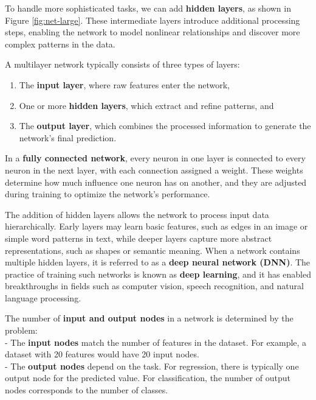 \documentclass[
]{book}
\providecommand{\tightlist}{%
  \setlength{\itemsep}{0pt}\setlength{\parskip}{0pt}}
\theoremstyle{definition}
\theoremstyle{definition}
\theoremstyle{definition}
\theoremstyle{definition}
\theoremstyle{remark}
\begin{document}
To handle more sophisticated tasks, we can add \textbf{hidden layers}, as shown in Figure \ref{fig:net-large}. These intermediate layers introduce additional processing steps, enabling the network to model nonlinear relationships and discover more complex patterns in the data.

A multilayer network typically consists of three types of layers:

\begin{enumerate}
\def\labelenumi{\arabic{enumi}.}
\tightlist
\item
  The \textbf{input layer}, where raw features enter the network,\\
\item
  One or more \textbf{hidden layers}, which extract and refine patterns, and\\
\item
  The \textbf{output layer}, which combines the processed information to generate the network's final prediction.
\end{enumerate}

In a \textbf{fully connected network}, every neuron in one layer is connected to every neuron in the next layer, with each connection assigned a weight. These weights determine how much influence one neuron has on another, and they are adjusted during training to optimize the network's performance.

The addition of hidden layers allows the network to process input data hierarchically. Early layers may learn basic features, such as edges in an image or simple word patterns in text, while deeper layers capture more abstract representations, such as shapes or semantic meaning. When a network contains multiple hidden layers, it is referred to as a \textbf{deep neural network (DNN)}. The practice of training such networks is known as \textbf{deep learning}, and it has enabled breakthroughs in fields such as computer vision, speech recognition, and natural language processing.

The number of \textbf{input and output nodes} in a network is determined by the problem:\\
- The \textbf{input nodes} match the number of features in the dataset. For example, a dataset with 20 features would have 20 input nodes.\\
- The \textbf{output nodes} depend on the task. For regression, there is typically one output node for the predicted value. For classification, the number of output nodes corresponds to the number of classes.
\end{document}
